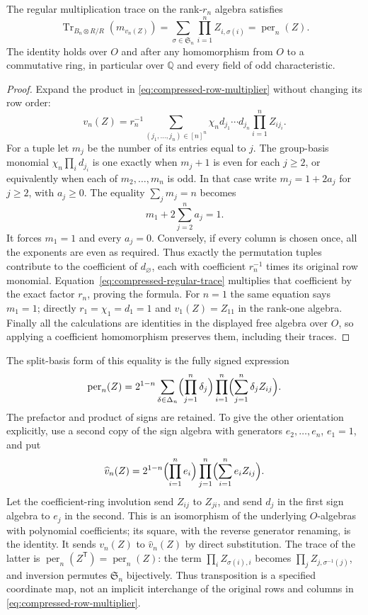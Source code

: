 \begin{theorem}\label{thm:compressed-permanent-trace}
The regular multiplication trace on the rank-$r_n$ algebra satisfies
\[
 \operatorname{Tr}_{B_n\otimes R/R}(m_{v_n(Z)})
 =\sum_{\sigma\in\mathfrak S_n}\prod_{i=1}^n Z_{i,\sigma(i)}
 =\operatorname{per}_n(Z).
\]
The identity holds over $O$ and after any homomorphism from $O$
to a commutative ring, in particular over $\mathbb Q$ and every
field of odd characteristic.
\end{theorem}
\begin{proof}
Expand the product in \eqref{eq:compressed-row-multiplier} without
changing its row order:
\[
 v_n(Z)=r_n^{-1}
 \sum_{(j_1,\ldots,j_n)\in[n]^n}
      \chi_n d_{j_1}\cdots d_{j_n}\prod_{i=1}^n Z_{ij_i}.
\]
For a tuple let $m_j$ be the number of its entries equal to $j$.
The group-basis monomial $\chi_n\prod_i d_{j_i}$ is one exactly
when $m_j+1$ is even for each $j\ge2$, or equivalently when each
of $m_2,\ldots,m_n$ is odd. In that case write $m_j=1+2a_j$
for $j\ge2$, with $a_j\ge0$. The equality $\sum_jm_j=n$ becomes
\[
 m_1+2\sum_{j=2}^n a_j=1.
\]
It forces $m_1=1$ and every $a_j=0$. Conversely, if every column
is chosen once, all the exponents are even as required. Thus exactly
the permutation tuples contribute to the coefficient of $d_\varnothing$,
each with coefficient $r_n^{-1}$ times its original row monomial.
Equation~\eqref{eq:compressed-regular-trace} multiplies that coefficient
by the exact factor $r_n$, proving the formula. For $n=1$ the
same equation says $m_1=1$; directly $r_1=\chi_1=d_1=1$ and
$v_1(Z)=Z_{11}$ in the rank-one algebra. Finally all the calculations
are identities in the displayed free algebra over $O$, so applying
a coefficient homomorphism preserves them, including their traces.
\end{proof}

The split-basis form of this equality is the fully signed expression
\[
 \operatorname{per}_n(Z)=2^{1-n}
 \sum_{\delta\in\Delta_n}
 \Bigl(\prod_{j=1}^n\delta_j\Bigr)
 \prod_{i=1}^n\Bigl(\sum_{j=1}^n\delta_j Z_{ij}\Bigr).
\]
The prefactor and product of signs are retained. To give the other
orientation explicitly, use a second copy of the sign algebra with
generators $e_2,\ldots,e_n$, $e_1=1$, and put
\[
 \widehat v_n(Z)=2^{1-n}
 \Bigl(\prod_{i=1}^n e_i\Bigr)
 \prod_{j=1}^n\Bigl(\sum_{i=1}^n e_i Z_{ij}\Bigr).
\]
Let the coefficient-ring involution send $Z_{ij}$ to $Z_{ji}$,
and send $d_j$ in the first sign algebra to $e_j$ in the second.
This is an isomorphism of the underlying $O$-algebras with polynomial
coefficients; its square, with the reverse generator renaming, is
the identity. It sends $v_n(Z)$ to $\widehat v_n(Z)$ by direct
substitution. The trace of the latter is
$\operatorname{per}_n(Z^{\mathsf T})=\operatorname{per}_n(Z)$:
the term $\prod_i Z_{\sigma(i),i}$ becomes
$\prod_j Z_{j,\sigma^{-1}(j)}$, and inversion permutes
$\mathfrak S_n$ bijectively. Thus transposition is a specified
coordinate map, not an implicit interchange of the original rows
and columns in \eqref{eq:compressed-row-multiplier}.


